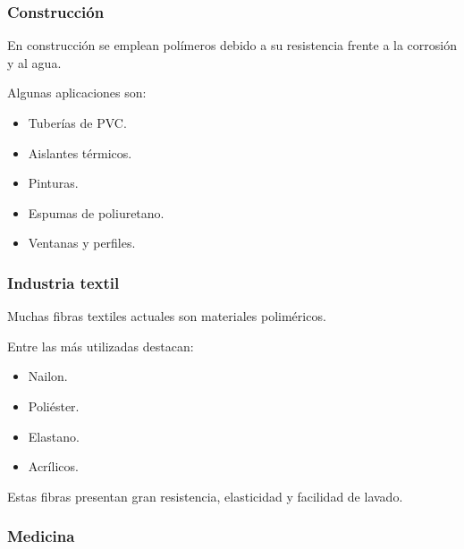 
\subsubsection*{Construcción}

En construcción se emplean polímeros debido a su resistencia frente a la corrosión
y al agua.

Algunas aplicaciones son:

\begin{itemize}

\item Tuberías de PVC.

\item Aislantes térmicos.

\item Pinturas.

\item Espumas de poliuretano.

\item Ventanas y perfiles.

\end{itemize}


\subsubsection*{Industria textil}

Muchas fibras textiles actuales son materiales poliméricos.

Entre las más utilizadas destacan:

\begin{itemize}

\item Nailon.

\item Poliéster.

\item Elastano.

\item Acrílicos.

\end{itemize}

Estas fibras presentan gran resistencia, elasticidad y facilidad de lavado.


\subsubsection*{Medicina}

